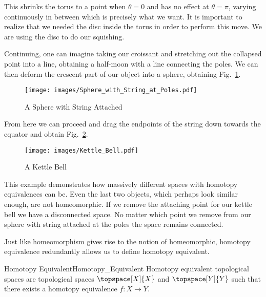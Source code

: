 \documentclass[oneside]{book}                                                  %
\begin{document}
                This shrinks the torus to a point when $\theta=0$ and has no
                effect at $\theta=\pi$, varying continuously in between which is
                precisely what we want. It is important to realize that we
                needed the disc inside the torus in order to perform this move.
                We are using the disc to do our squishing.
                \par\hfill\par
                Continuing, one can imagine taking our croissant and stretching
                out the collapsed point into a line, obtaining a half-moon with
                a line connecting the poles. We can then deform the crescent
                part of our object into a sphere, obtaining
                Fig.~\ref{fig:Sphere_with_String_Attached}. 
                \begin{figure}[H]
                    \centering
                    \captionsetup{type=figure}
                    \texttt{[image: images/Sphere\_with\_String\_at\_Poles.pdf]}
                    \caption{A Sphere with String Attached}
                    \label{fig:Sphere_with_String_Attached}
                \end{figure}From here
                we can proceed and drag the endpoints of the string down towards
                the equator and obtain Fig.~\ref{fig:Kettle_Bell}.
                \begin{figure}[H]
                    \centering
                    \captionsetup{type=figure}
                    \texttt{[image: images/Kettle\_Bell.pdf]}
                    \caption{A Kettle Bell}
                    \label{fig:Kettle_Bell}
                \end{figure}
                This example demonstrates how massively different spaces with
                homotopy equivalences can be. Even the last two objects, which
                perhaps look similar enough, are not homeomorphic. If we remove
                the attaching point for our kettle bell we have a disconnected
                space. No matter which point we remove from our sphere with
                string attached at the poles the space remains connected.
                \par\hfill\par
                Just like homeomorphism gives rise to the notion of
                homeomorphic, homotopy equivalence redundantly allows us to
                define homotopy equivalent.
                \begin{fdefinition}{Homotopy Equivalent}{Homotopy_Equivalent}
                    Homotopy equivalent topological spaces are topological
                    spaces $\topspace[X]{X}$ and $\topspace[Y]{Y}$ such that
                    there exists a homotopy equivalence $f:X\rightarrow{Y}$.
                \end{fdefinition}
\end{document}

